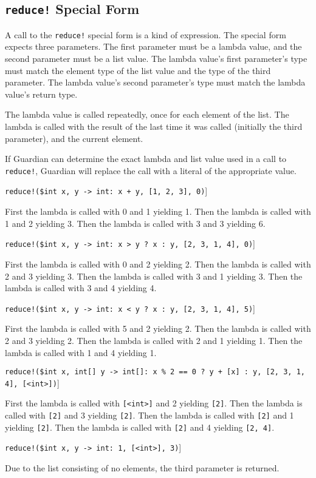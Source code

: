 
\subsection{\texttt{reduce!} Special Form}
{
	A call to the \texttt{reduce!} special form is a kind of expression.
	The special form expects three parameters.
	The first parameter must be a lambda value, and the
	second parameter must be a list value.
	The lambda value's first parameter's type
	must match the element type of the list value and the type of the third
	parameter. The lambda value's
	second parameter's type must match the lambda value's return type.
	
	The lambda value is called repeatedly, once for each element of the list.
	The lambda is called with the result of the last time it was
	called (initially the third parameter), and
	the current element.
	
	If Guardian can determine the exact lambda and list value used in a call to
	\texttt{reduce!}, Guardian will replace the call with a literal of
	the appropriate value.
	
	\begin{itemize}
	{
		\item \texttt{reduce!(\$int x, y -> int: x + y, [1, 2, 3], 0)}]
		
			First the lambda is called with 0 and 1 yielding 1.
			Then the lambda is called with 1 and 2 yielding 3.
			Then the lambda is called with 3 and 3 yielding 6.
		
		\item \texttt{reduce!(\$int x, y -> int: x > y ? x : y, [2, 3, 1, 4], 0)}]
		
			First the lambda is called with 0 and 2 yielding 2.
			Then the lambda is called with 2 and 3 yielding 3.
			Then the lambda is called with 3 and 1 yielding 3.
			Then the lambda is called with 3 and 4 yielding 4.
		
		\item \texttt{reduce!(\$int x, y -> int: x < y ? x : y, [2, 3, 1, 4], 5)}]
		
			First the lambda is called with 5 and 2 yielding 2.
			Then the lambda is called with 2 and 3 yielding 2.
			Then the lambda is called with 2 and 1 yielding 1.
			Then the lambda is called with 1 and 4 yielding 1.
			
		\item \texttt{reduce!(\$int x, int[] y -> int[]: x \% 2 == 0 ? y + [x] : y, [2, 3, 1, 4], [<int>])}]
		
			First the lambda is called with \texttt{[<int>]} and 2 yielding \texttt{[2]}.
			Then the lambda is called with \texttt{[2]} and 3 yielding \texttt{[2]}.
			Then the lambda is called with \texttt{[2]} and 1 yielding \texttt{[2]}.
			Then the lambda is called with \texttt{[2]} and 4 yielding \texttt{[2, 4]}.
			
		\item \texttt{reduce!(\$int x, y -> int: 1, [<int>], 3)}]
		
			Due to the list consisting of no elements, the third parameter
			is returned.
	}
	\end{itemize}
}













